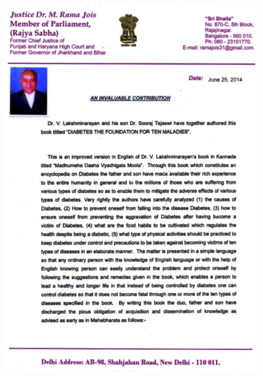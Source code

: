 \thispagestyle{empty}


\begin{figure}[h]
\centering
\includegraphics[scale=2.1]{images/002.jpg}
\end{figure}


